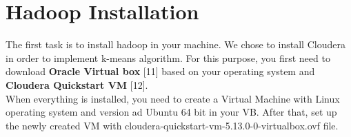 
\chapter{Hadoop Installation} %

\label{Chapter1} %

The first task is to install hadoop in your machine. We chose to install Cloudera in order to implement k-means algorithm. For this purpose, you first need to download \textbf{Oracle Virtual box} [11] based on your operating system and \textbf{Cloudera Quickstart VM} [12].\\
When everything is installed, you need to create a Virtual Machine with Linux operating system and version ad Ubuntu 64 bit in your VB. After that, set up the newly created VM with cloudera-quickstart-vm-5.13.0-0-virtualbox.ovf
file.
